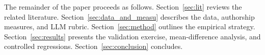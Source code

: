 The remainder of the paper proceeds as follows. Section~\ref{sec:lit} reviews the related literature. Section~\ref{sec:data_and_measu} describes the data, authorship measures, and LLM rubric. Section~\ref{sec:method} outlines the empirical strategy. Section~\ref{sec:results} presents the validation exercise, mean-difference analysis, and controlled regressions. Section~\ref{sec:conclusion} concludes.